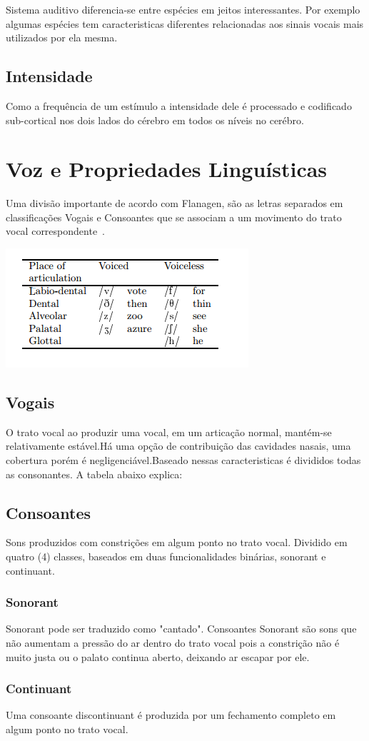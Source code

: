 	Sistema auditivo diferencia-se entre espécies em jeitos interessantes.
	Por exemplo algumas espécies tem caracteristicas diferentes relacionadas aos sinais vocais mais utilizados por ela mesma.\cite{Foundation1}
	
	\subsection{Intensidade}
	Como a frequência de um estímulo a intensidade dele é processado e codificado sub-cortical nos dois lados do cérebro em todos os níveis no cerébro.\cite{Foundation1}
		


\section{Voz e Propriedades Linguísticas}
	Uma divisão importante de acordo com Flanagen, são as letras separados em classificações Vogais e Consoantes que se associam a um movimento do trato vocal correspondente~\cite{JFlanagan}.
	
	\includegraphics{tabelaConsoantes.png}
	
	\subsection{Vogais}
	
	O trato vocal ao produzir uma vocal, em um articação normal, mantém-se relativamente estável.Há uma opção de contribuição das cavidades nasais, uma cobertura porém é negligenciável.Baseado nessas caracteristicas é divididos todas as consonantes. A tabela abaixo explica:
	
	
	\subsection{Consoantes}
	Sons produzidos com constrições em algum ponto no trato vocal. Dividido em quatro (4) classes, baseados em duas funcionalidades binárias, sonorant e continuant.
	
	
		\subsubsection{Sonorant}	 
			Sonorant pode ser traduzido como "cantado". Consoantes Sonorant são sons que não aumentam a pressão do ar dentro do trato vocal pois a constrição não é muito justa ou o palato continua aberto, deixando ar escapar por ele.
			
		\subsubsection{Continuant}
			Uma consoante discontinuant é produzida por um fechamento completo em algum ponto no trato vocal.

